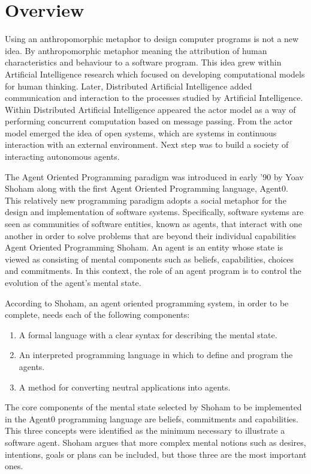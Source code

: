\documentclass[a4paper,12pt,oneside,fleqn]{book} %
\theoremstyle{plain}
\theoremstyle{definition}
\theoremstyle{remark}
\begin{document}
\section{Overview} %

Using an anthropomorphic metaphor to design computer programs is not a new
idea. By anthropomorphic metaphor meaning the attribution of human
characteristics and behaviour to a software program. This idea grew within
Artificial Intelligence research which focused on developing computational
models for human thinking. Later, Distributed Artificial Intelligence added
communication and interaction to the processes studied by Artificial
Intelligence.  Within Distributed Artificial Intelligence appeared the
actor model as a way of performing concurrent computation based on message
passing. From the actor model emerged the idea of open systems, which are
systems in continuous interaction with an external environment. Next step
was to build a society of interacting autonomous agents.

The Agent Oriented Programming paradigm was introduced in early '90 by Yoav
Shoham along with the first Agent Oriented Programming language, Agent0.
This relatively new programming paradigm adopts a social metaphor for the
design and implementation of software systems. Specifically, software
systems are seen as communities of software entities, known as agents, that
interact with one another in order to solve problems that are beyond their
individual capabilities \cite{}Agent Oriented Programming Shoham. An agent
is an entity whose state is viewed as consisting of mental components such
as beliefs, capabilities, choices and commitments. In this context, the role
of an agent program is to control the evolution of the agent's mental
state.

According to Shoham, an agent oriented programming system, in order to be
complete, needs each of the following components: 
\begin{enumerate}
   \item A formal language with a clear syntax for describing the mental state. 
   \item An interpreted programming language in which to define and program the agents. 
   \item A method for converting neutral applications into agents.
\end{enumerate}

The core components of the mental state selected by Shoham to be
implemented in the Agent0 programming language are beliefs, commitments and
capabilities. This three concepts were identified as the minimum necessary
to illustrate a software agent. Shoham argues that more complex mental
notions such as desires, intentions, goals or plans can be included, but
those three are the most important ones.
\end{document}
